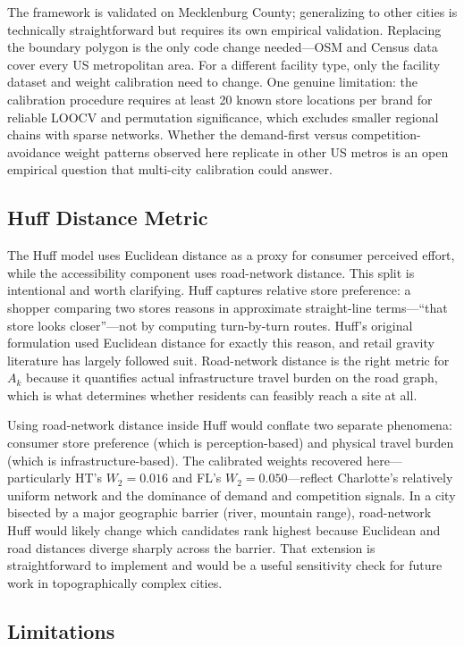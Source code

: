\documentclass[conference]{IEEEtran}
\begin{document}
The framework is validated on Mecklenburg County; generalizing to
other cities is technically straightforward but requires its own
empirical validation. Replacing the boundary polygon is the only
code change needed---OSM and Census data cover every US metropolitan
area. For a different facility type, only the facility dataset and
weight calibration need to change. One genuine limitation: the
calibration procedure requires at least 20 known store locations per
brand for reliable LOOCV and permutation significance, which excludes
smaller regional chains with sparse networks. Whether the
demand-first versus competition-avoidance weight patterns observed
here replicate in other US metros is an open empirical question that
multi-city calibration could answer.

\subsection{Huff Distance Metric}

The Huff model uses Euclidean distance as a proxy for consumer
perceived effort, while the accessibility component uses road-network
distance. This split is intentional and worth clarifying. Huff
captures relative store preference: a shopper comparing two stores
reasons in approximate straight-line terms---``that store looks
closer''---not by computing turn-by-turn routes. Huff's original
formulation used Euclidean distance for exactly this reason, and
retail gravity literature has largely followed suit. Road-network
distance is the right metric for $A_k$ because it quantifies actual
infrastructure travel burden on the road graph, which is what
determines whether residents can feasibly reach a site at all.

Using road-network distance inside Huff would conflate two separate
phenomena: consumer store preference (which is perception-based) and
physical travel burden (which is infrastructure-based). The calibrated
weights recovered here---particularly HT's $W_2 = 0.016$ and FL's
$W_2 = 0.050$---reflect Charlotte's relatively uniform network and
the dominance of demand and competition signals. In a city bisected
by a major geographic barrier (river, mountain range), road-network
Huff would likely change which candidates rank highest because
Euclidean and road distances diverge sharply across the barrier. That
extension is straightforward to implement and would be a useful
sensitivity check for future work in topographically complex cities.

\subsection{Limitations}
\end{document}
